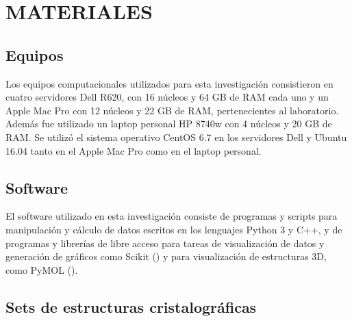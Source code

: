 \newpage
\section*{MATERIALES}
\par{}
\subsection{Equipos}
\par
Los equipos computacionales utilizados para esta investigación consistieron en cuatro 
servidores Dell R620, con 16 núcleos y 64 GB de RAM cada uno y un Apple Mac Pro con 
12 núcleos y 22 GB de RAM, pertenecientes al laboratorio. 
Además fue utilizado un laptop personal HP 8740w con 4 núcleos y 20 GB de RAM. 
Se utilizó el sistema operativo CentOS 6.7 en los servidores Dell y Ubuntu 16.04 
tanto en el Apple Mac Pro como en el laptop 
personal.
\subsection{Software}
\par
El software utilizado en esta investigación consiste de programas y scripts para manipulación y 
cálculo de datos escritos en los lenguajes Python 3 y C++, y de programas y librerías de libre 
acceso para tareas de visualización de datos y generación de gráficos como Scikit 
(\cite{Pedregosa2012}) y para visualización de estructuras 3D, como PyMOL (\cite{PyMOL}).

\subsection{Sets de estructuras cristalográficas}

